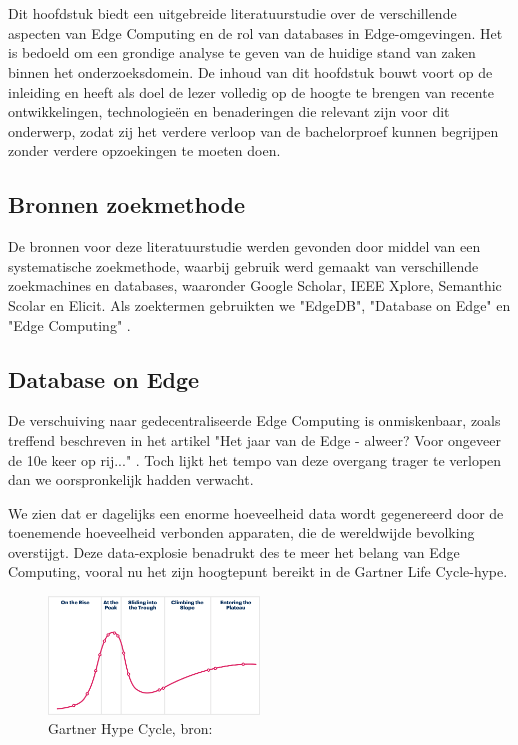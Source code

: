 \chapter{}%
\label{ch:stand-van-zaken}

Dit hoofdstuk biedt een uitgebreide literatuurstudie over de verschillende aspecten van Edge Computing en de rol van databases in Edge-omgevingen.
Het is bedoeld om een grondige analyse te geven van de huidige stand van zaken binnen het onderzoeksdomein.
De inhoud van dit hoofdstuk bouwt voort op de inleiding en heeft als doel de lezer volledig op de hoogte te brengen van recente ontwikkelingen, technologieën en benaderingen die relevant zijn voor dit onderwerp, zodat zij het verdere verloop van de bachelorproef kunnen begrijpen zonder verdere opzoekingen te moeten doen.

\section{Bronnen zoekmethode}
De bronnen voor deze literatuurstudie werden gevonden door middel van een systematische zoekmethode, waarbij gebruik werd gemaakt van verschillende zoekmachines en databases, waaronder Google Scholar, IEEE Xplore, Semanthic Scolar en Elicit.
 Als zoektermen gebruikten we "EdgeDB", "Database on Edge" en "Edge Computing" \autocite{Yang2019EdgeDBAE, Paparrizos2021VergeDBAD, Gyorodi2015comparative}.

\section{Database on Edge}

De verschuiving naar gedecentraliseerde Edge Computing is onmiskenbaar, zoals treffend beschreven in het artikel "Het jaar van de Edge - alweer? Voor ongeveer de 10e keer op rij..." \autocite{Dollinger2022}. Toch lijkt het tempo van deze overgang trager te verlopen dan we oorspronkelijk hadden verwacht.

We zien dat er dagelijks een enorme hoeveelheid data wordt gegenereerd door de toenemende hoeveelheid verbonden apparaten, die de wereldwijde bevolking overstijgt. Deze data-explosie benadrukt des te meer het belang van Edge Computing, vooral nu het zijn hoogtepunt bereikt in de Gartner Life Cycle-hype.

\begin{figure}[h]
    \centering
    \includegraphics[width=0.5\textwidth]{hype-cycle-illustation.png}
    \caption{Gartner Hype Cycle, bron: \autocite{Gartner2023}}
    \label{fig:hype-cycle}
\end{figure}


